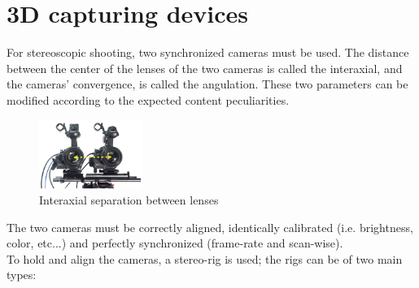 \section{3D capturing devices}
For stereoscopic shooting, two synchronized cameras must be used. The distance between the center of the lenses of the two cameras is called the interaxial, and the cameras' convergence, is called the angulation. These two parameters can be modified according to the expected content peculiarities.\\
\begin{figure}[h!]
\centering
\includegraphics[width=0.3\textwidth]{./img/interaxial-separation.png}
\caption{\small{Interaxial separation between lenses}}
\label{fig:interaxial}
\end{figure}
The two cameras must be correctly aligned, identically calibrated (i.e. brightness, color, etc...) and perfectly synchronized (frame-rate and scan-wise).\\
To hold and align the cameras, a stereo-rig is used; the rigs can be of two main types:\\
